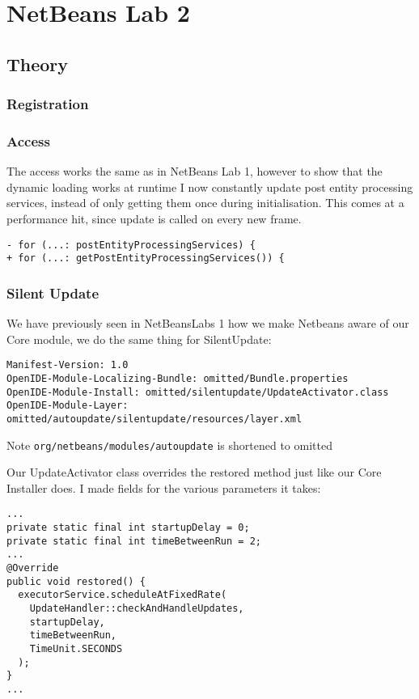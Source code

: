 \section{NetBeans Lab 2}

\subsection{Theory}
\subsubsection{Registration}

\subsubsection{Access}
The access works the same as in NetBeans Lab 1, however to show that the dynamic
loading works at runtime I now constantly update post entity processing
services, instead of only getting them once during initialisation.
This comes at a performance hit, since update is called on every new frame.

\begin{verbatim}
- for (...: postEntityProcessingServices) {
+ for (...: getPostEntityProcessingServices()) {
\end{verbatim}

\subsubsection{Silent Update}
We have previously seen in NetBeansLabs 1 how we make Netbeans aware of our Core
module, we do the same thing for SilentUpdate:

\begin{verbatim}
Manifest-Version: 1.0
OpenIDE-Module-Localizing-Bundle: omitted/Bundle.properties
OpenIDE-Module-Install: omitted/silentupdate/UpdateActivator.class
OpenIDE-Module-Layer: omitted/autoupdate/silentupdate/resources/layer.xml
\end{verbatim}
Note \texttt{org/netbeans/modules/autoupdate} is shortened to omitted

Our UpdateActivator class overrides the restored method just like our Core
Installer does.
I made fields for the various parameters it takes:
\begin{verbatim}
...
private static final int startupDelay = 0;
private static final int timeBetweenRun = 2;
...
@Override
public void restored() {
  executorService.scheduleAtFixedRate(
    UpdateHandler::checkAndHandleUpdates,
    startupDelay,
    timeBetweenRun,
    TimeUnit.SECONDS
  );
}
...
\end{verbatim}

